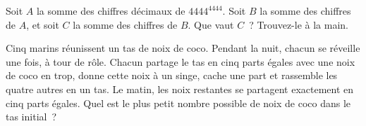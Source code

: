 \begin{question}\label{iq:iv1:number-riddles:24}
Soit $A$ la somme des chiffres décimaux de $4444^{4444}$. Soit $B$ la somme des chiffres de $A$, et soit $C$ la somme des chiffres de $B$. Que vaut $C$~? Trouvez-le à la main.
\end{question}

\begin{question}\label{iq:iv1:number-riddles:25}
Cinq marins réunissent un tas de noix de coco. Pendant la nuit, chacun se réveille une fois, à tour de rôle. Chacun partage le tas en cinq parts égales avec une noix de coco en trop, donne cette noix à un singe, cache une part et rassemble les quatre autres en un tas. Le matin, les noix restantes se partagent exactement en cinq parts égales. Quel est le plus petit nombre possible de noix de coco dans le tas initial~?
\end{question}

